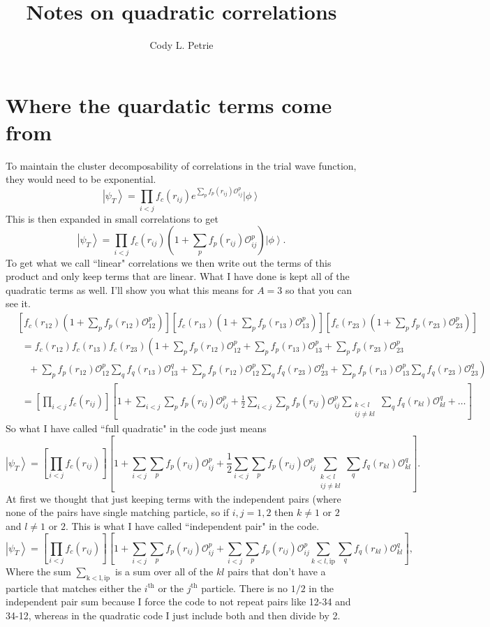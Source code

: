 \documentclass[12pt]{article}
\title{Notes on quadratic correlations}
\author{Cody L. Petrie}
\newcommand{\ket}[1]{\left| #1 \right>}
\newcommand{\fpij}{f_p(r_{ij})}
\newcommand{\Opij}{\mathcal{O}_{ij}^p}
\newcommand{\fOpij}{\sum\limits_{i<j}\sum\limits_p \fpij\Opij}
\newcommand{\fqkl}{f_q(r_{kl})}
\newcommand{\Oqkl}{\mathcal{O}_{kl}^q}
\newcommand{\fOqklip}{\sum\limits_{k<l,\mathrm{ip}}\sum\limits_q \fqkl\Oqkl}
\newcommand{\fOqklquad}{\sum_{\substack{k<l\\ij \ne kl}}\sum\limits_q \fqkl\Oqkl}
\newcommand{\f}[2]{f_{#1}(r_{#2})}
\newcommand{\fO}[2]{\sum\limits_{#1} f_{#1}(r_{#2})\mathcal{O}_{#2}^{#1}}
\begin{document}
\maketitle

\section{Where the quardatic terms come from}
To maintain the cluster decomposability of correlations in the trial wave function, they would need to be exponential.
\begin{equation}
   \ket{\psi_T} = \prod\limits_{i<j}f_c(r_{ij}) e^{\sum\limits_p\fpij\Opij} \ket{\phi}
\end{equation}
This is then expanded in small correlations to get
\begin{equation}
   \ket{\psi_T} = \prod\limits_{i<j}f_c(r_{ij}) \left(1+\sum\limits_p\fpij\Opij\right) \ket{\phi}.
\end{equation}
To get what we call ``linear" correlations we then write out the terms of this product and only keep terms that are linear. What I have done is kept all of the quadratic terms as well. I'll show you what this means for $A=3$ so that you can see it.
\begin{equation}
\begin{split}
   &\left[\f{c}{12}\left(1+\fO{p}{12}\right)\right]\left[\f{c}{13}\left(1+\fO{p}{13}\right)\right]\left[\f{c}{23}\left(1+\fO{p}{23}\right)\right] \\
   &~~=\f{c}{12}\f{c}{13}\f{c}{23}\left(1+\fO{p}{12}+\fO{p}{13}+\fO{p}{23}\right. \\
   &~~~~~+\left.\fO{p}{12}\fO{q}{13}+\fO{p}{12}\fO{q}{23}+\fO{p}{13}\fO{q}{23}\right) \\
   &~~= \left[\prod\limits_{i<j}\f{c}{ij}\right]\left[1+\fOpij+\frac{1}{2}\fOpij\fOqklquad + \ldots \right]
\end{split}
\end{equation}
So what I have called ``full quadratic" in the code just means
\begin{equation}
   \ket{\psi_T} = \left[\prod\limits_{i<j}\f{c}{ij}\right]\left[1+\fOpij+\frac{1}{2}\fOpij\fOqklquad \right].
\end{equation}
At first we thought that just keeping terms with the independent pairs (where none of the pairs have single matching particle, so if $i,j = 1,2$ then $k\ne1$ or $2$ and $l\ne1$ or $2$. This is what I have called ``independent pair" in the code.
\begin{equation}
   \ket{\psi_T} = \left[\prod\limits_{i<j}\f{c}{ij}\right]\left[1+\fOpij+\fOpij\fOqklip \right],
\end{equation}
Where the sum $\sum\limits_{\mathrm{k<l,ip}}$ is a sum over all of the $kl$ pairs that don't have a particle that matches either the $i^\mathrm{th}$ or the $j^\mathrm{th}$ particle.
There is no $1/2$ in the independent pair sum because I force the code to not repeat pairs like 12-34 and 34-12, whereas in the quadratic code I just include both and then divide by 2.
\end{document}
